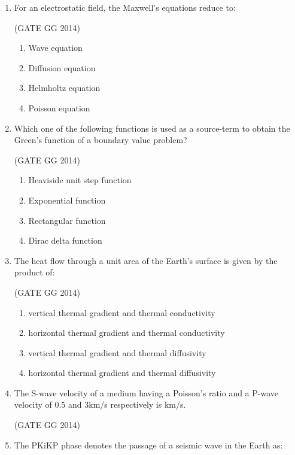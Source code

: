 \documentclass[journal]{IEEEtran}
\begin{document}
\begin{enumerate}[start=26]
\item For an electrostatic field, the Maxwell's equations reduce to:

\hfill(GATE GG 2014)
\begin{multicols}{2}
    \begin{enumerate}
    \item Wave equation
    \item Diffusion equation
    \item Helmholtz equation
    \item Poisson equation
\end{enumerate}
\end{multicols}

\item Which one of the following functions is used as a source-term to obtain the Green's function of a boundary value problem?

\hfill(GATE GG 2014)
\begin{multicols}{2}
    \begin{enumerate}
    \item Heaviside unit step function
    \item Exponential function
    \item Rectangular function
    \item Dirac delta function
\end{enumerate}
\end{multicols}

\item The heat flow through a unit area of the Earth's surface is given by the product of:

\hfill(GATE GG 2014)
\begin{enumerate}
    \item vertical thermal gradient and thermal conductivity
    \item horizontal thermal gradient and thermal conductivity
    \item vertical thermal gradient and thermal diffusivity
    \item horizontal thermal gradient and thermal diffusivity
\end{enumerate}

\item The S-wave velocity of a medium having a Poisson's ratio and a P-wave velocity of $0.5$ and $3$km/s respectively is \underline{\hspace{2cm}}km/s.

\hfill(GATE GG 2014)
\item The PKiKP phase denotes the passage of a seismic wave in the Earth as:


\end{enumerate}
\end{document}
